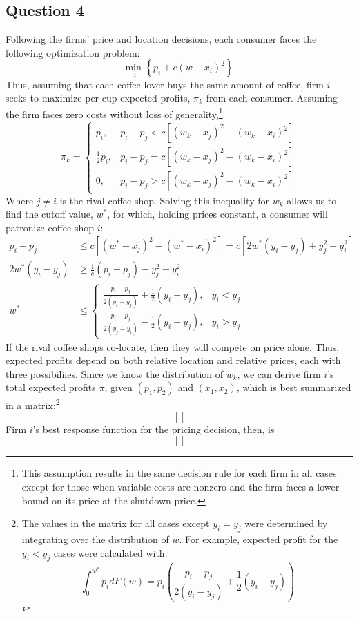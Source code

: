 \documentclass{article}
\newcommand{\usmin}[1]{\underset{#1}{\text{min }}}
\begin{document}
\pagebreak
\subsection*{Question 4}
Following the firms' price and location decisions, each consumer faces the following optimization problem:
\[
	\usmin{i}\left\{p_i + c\left(w-x_i\right)^2\right\}
\]
Thus, assuming that each coffee lover buys the same amount of coffee, firm $i$ seeks to maximize per-cup expected profits, $\pi_k$ from each consumer. Assuming the firm faces zero costs without loss of generality,\footnote{This assumption results in the same decision rule for each firm in all cases except for those when variable costs are nonzero and the firm faces a lower bound on its price at the shutdown price.}
\[
	\pi_k = \begin{cases} 	p_i, & p_i - p_j < c\left[(w_k-x_j)^2 - (w_k-x_i)^2\right] \\ \frac{1}{2}p_i, & p_i - p_j = c\left[(w_k-x_j)^2 - (w_k-x_i)^2\right] \\ 
							0, & p_i - p_j > c\left[(w_k-x_j)^2 - (w_k-x_i)^2\right]	\end{cases}
\]
Where ${j\neq i}$ is the rival coffee shop. Solving this inequality for $w_k$ allows us to find the cutoff value, $w^*$, for which, holding prices constant, a consumer will patronize coffee shop $i$:
\begin{align*}
	p_i - p_j &\leq c\left[(w^*-x_j)^2 - (w^*-x_i)^2\right] = c\left[2w^*(y_i-y_j) + y_j^2-y_i^2\right]	\\
	2w^*(y_i-y_j) &\geq \frac{1}{c}(p_i-p_j) - y_j^2 + y_i^2 	\\
	w^* &\leq 	\begin{cases} 	\frac{p_i - p_j}{2(y_i - y_j)} + \frac{1}{2}(y_i + y_j), & y_i<y_j \\
								\frac{p_i - p_j}{2(y_j - y_i)} - \frac{1}{2}(y_i + y_j), & y_i>y_j
				\end{cases}
\end{align*}
If the rival coffee shops co-locate, then they will compete on price alone. Thus, expected profits depend on both relative location and relative prices, each with three possibiliies. Since we know the distribution of $w_k$, we can derive firm $i$'s total expected profits $\pi$, given $(p_1,p_2)$ and $(x_1,x_2)$, which is best summarized in a matrix:\footnote{The values in the matrix for all cases except ${y_i=y_j}$ were determined by integrating over the distribution of $w$. For example, expected profit for the ${y_i<y_j}$ cases were calculated with: $$ \int_0^{w^*}p_idF(w) = p_i\left(\frac{p_i - p_j}{2(y_i - y_j)} + \frac{1}{2}(y_i + y_j)\right) $$}
\[
	[]
\]
Firm $i$'s best response function for the pricing decision, then, is 
\[
	[]
\]


\end{document}
